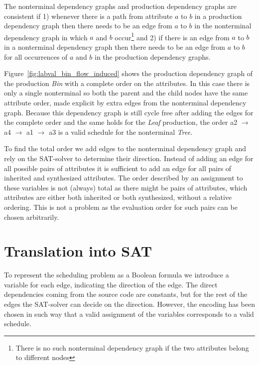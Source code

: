 \documentclass{llncs}
\newcommand{\figref}[1]{Figure~\ref{#1}}
\begin{document}
The nonterminal dependency graphs and production dependency graphs are consistent if 1) whenever there is a path from attribute $a$ to $b$ in a production dependency graph then there needs to be an edge from $a$ to $b$ in the nonterminal dependency graph in which $a$ and $b$ occur\footnote{There is no such nonterminal dependency graph if the two attributes belong to different nodes} and 2) if there is an edge from $a$ to $b$ in a nonterminal dependency graph then there needs to be an edge from $a$ to $b$ for all occurrences of $a$ and $b$ in the production dependency graphs.


\figref{fig:labval_bin_flow_induced} shows the production dependency graph of the production \emph{Bin} with a complete order on the attributes. In this case there is only a single nonterminal so both the parent and the child nodes have the same attribute order, made explicit by extra edges from the nonterminal dependency graph. Because this dependency graph is still cycle free after adding the edges for the complete order and the same holds for the \emph{Leaf} production, the order a2 $\rightarrow$ a4 $\rightarrow$ a1 $\rightarrow$ a3 is a valid schedule for the nonterminal \emph{Tree}.

To find the total order we add edges to the nonterminal dependency graph and rely on the SAT-solver to determine their direction. Instead of adding an edge for all possible pairs of attributes it is sufficient to add an edge for all pairs of inherited and synthesized attributes.
The order described by an assignment to these variables is not (always) total as there might be pairs of attributes, which attributes are either both inherited or both synthesized, without a relative ordering. This is not a problem as the evaluation order for such pairs can be chosen arbitrarily.


\section{Translation into SAT} \label{sect:translation}
To represent the scheduling problem as a Boolean formula we introduce a variable for each edge, indicating the direction of the edge. The direct dependencies coming from the source code are constants, but for the rest of the edges the SAT-solver can decide on the direction. However, the encoding has been chosen in such way that a valid assignment of the variables corresponds to a valid schedule.
\end{document}
